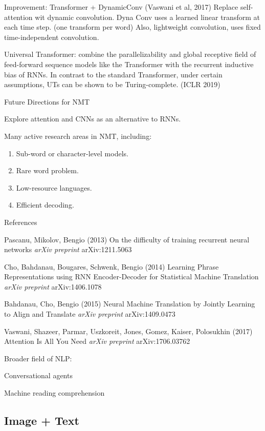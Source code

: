 \documentclass[english]{article}
\begin{document}
Improvement: Transformer + DynamicConv (Vaswani et al, 2017) Replace self-attention wit dynamic convolution. Dyna Conv uses a learned linear transform at each time step. (one transform per word) Also, lightweight convolution, uses fixed time-independent convolution.

Universal Transformer: combine the parallelizability and global receptive field of feed-forward sequence models like the Transformer with the recurrent inductive bias of RNNs. In contrast to the standard Transformer, under certain assumptions, UTs can be shown to be Turing-complete. (ICLR 2019)


\item 
 {Future Directions for NMT}

Explore attention and CNNs as an alternative to RNNs.
 
Many active research areas in NMT, including:
\begin{enumerate}
\item Sub-word or character-level models.
\item Rare word problem.
\item Low-resource languages.
\item Efficient decoding.
\end{enumerate}

\item {References}

Pascanu, Mikolov, Bengio (2013) {On the difficulty of training recurrent neural networks}
 {\emph{arXiv preprint} arXiv:1211.5063}
 
Cho, Bahdanau, Bougares, Schwenk, Bengio (2014)
  {
  Learning Phrase Representations using RNN Encoder-Decoder for Statistical Machine Translation}
  {\emph{arXiv preprint} arXiv:1406.1078}
 
Bahdanau, Cho, Bengio (2015)
  {Neural Machine Translation by Jointly Learning to Align and Translate}
 {\emph{arXiv preprint} arXiv:1409.0473}
 
 Vaswani, Shazeer, Parmar, Uszkoreit, Jones, Gomez, Kaiser, Polosukhin (2017)
 {Attention Is All You Need}
 {\emph{arXiv preprint} arXiv:1706.03762}


\item Broader field of NLP: 

Conversational agents

Machine reading comprehension

\eenum

\subsection{Image + Text}
\end{document}
